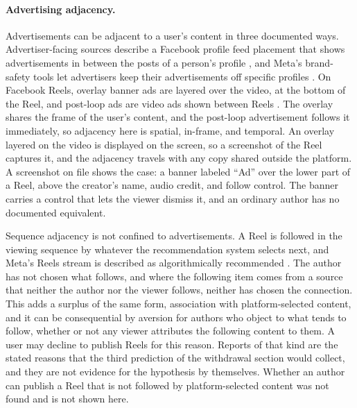 \paragraph{Advertising adjacency.} Advertisements can be adjacent to a user's content in three documented ways. Advertiser-facing sources describe a Facebook profile feed placement that shows advertisements in between the posts of a person's profile \cite{nestscale}, and Meta's brand-safety tools let advertisers keep their advertisements off specific profiles \cite{emarketer}. On Facebook Reels, overlay banner ads are layered over the video, at the bottom of the Reel, and post-loop ads are video ads shown between Reels \cite{smt-reels}. The overlay shares the frame of the user's content, and the post-loop advertisement follows it immediately, so adjacency here is spatial, in-frame, and temporal. An overlay layered on the video is displayed on the screen, so a screenshot of the Reel captures it, and the adjacency travels with any copy shared outside the platform. A screenshot on file shows the case: a banner labeled ``Ad'' over the lower part of a Reel, above the creator's name, audio credit, and follow control. The banner carries a control that lets the viewer dismiss it, and an ordinary author has no documented equivalent.

Sequence adjacency is not confined to advertisements. A Reel is followed in the viewing sequence by whatever the recommendation system selects next, and Meta's Reels stream is described as algorithmically recommended \cite{smt-reels}. The author has not chosen what follows, and where the following item comes from a source that neither the author nor the viewer follows, neither has chosen the connection. This adds a surplus of the same form, association with platform-selected content, and it can be consequential by aversion for authors who object to what tends to follow, whether or not any viewer attributes the following content to them. A user may decline to publish Reels for this reason. Reports of that kind are the stated reasons that the third prediction of the withdrawal section would collect, and they are not evidence for the hypothesis by themselves. Whether an author can publish a Reel that is not followed by platform-selected content was not found and is not shown here.

